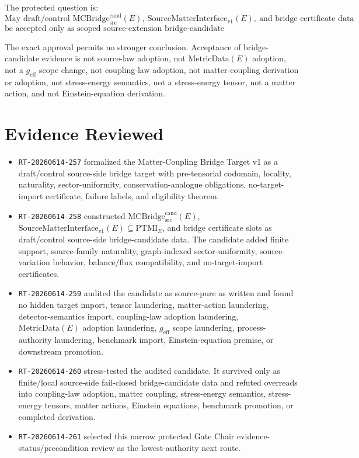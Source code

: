 \documentclass[11pt]{article}
\newcommand{\MetricData}{\mathrm{MetricData}}
\newcommand{\geff}{g_{\mathrm{eff}}}
\newcommand{\MCBridgeCand}{\mathrm{MCBridge}_{\mathrm{src}}^{\mathrm{cand}}}
\newcommand{\SMI}{\mathrm{SourceMatterInterface}_{v1}}
\newcommand{\PTMI}{\mathrm{PTMI}}
\begin{document}
The protected question is:
\[
\text{May draft/control }\MCBridgeCand(E),\ \SMI(E),\ \text{and bridge
certificate data}
\]
\[
\text{be accepted only as scoped source-extension bridge-candidate evidence/precondition?}
\]

The exact approval permits no stronger conclusion. Acceptance of
bridge-candidate evidence is not source-law adoption, not \(\MetricData(E)\)
adoption, not a \(\geff\) scope change, not coupling-law adoption, not
matter-coupling derivation or adoption, not stress-energy semantics, not a
stress-energy tensor, not a matter action, and not Einstein-equation
derivation.

\section{Evidence Reviewed}

\begin{itemize}[leftmargin=*]
  \item \texttt{RT-20260614-257} formalized the Matter-Coupling Bridge Target
  v1 as a draft/control source-side bridge target with pre-tensorial codomain,
  locality, naturality, sector-uniformity, conservation-analogue obligations,
  no-target-import certificate, failure labels, and eligibility theorem.
  \item \texttt{RT-20260614-258} constructed \(\MCBridgeCand(E)\),
  \(\SMI(E)\subseteq\PTMI_E\), and bridge certificate slots as draft/control
  source-side bridge-candidate data. The candidate added finite support,
  source-family naturality, graph-indexed sector-uniformity, source-variation
  behavior, balance/flux compatibility, and no-target-import certificates.
  \item \texttt{RT-20260614-259} audited the candidate as source-pure as
  written and found no hidden target import, tensor laundering, matter-action
  laundering, detector-semantics import, coupling-law adoption laundering,
  \(\MetricData(E)\) adoption laundering, \(\geff\) scope laundering,
  process-authority laundering, benchmark import, Einstein-equation premise,
  or downstream promotion.
  \item \texttt{RT-20260614-260} stress-tested the audited candidate. It
  survived only as finite/local source-side fail-closed bridge-candidate data
  and refuted overreads into coupling-law adoption, matter coupling,
  stress-energy semantics, stress-energy tensors, matter actions, Einstein
  equations, benchmark promotion, or completed derivation.
  \item \texttt{RT-20260614-261} selected this narrow protected Gate Chair
  evidence-status/precondition review as the lowest-authority next route.
\end{itemize}
\end{document}
